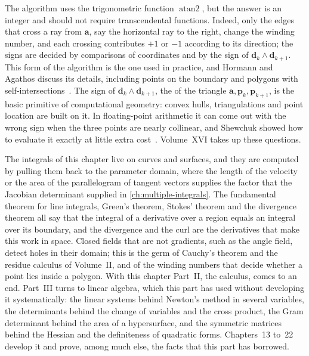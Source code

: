 The algorithm uses the trigonometric function $\operatorname{atan2}$, but the answer is an integer and should not require transcendental functions. Indeed, only the edges that cross a ray from $\mathbf a$, say the horizontal ray to the right, change the winding number, and each crossing contributes $+1$ or $-1$ according to its direction; the signs are decided by comparisons of coordinates and by the sign of $\mathbf d_k\wedge\mathbf d_{k+1}$. This  form of the algorithm is the one used in practice, and Hormann and Agathos discuss its details, including points on the boundary and polygons with self-intersections~\cite{hormann2001}. The sign of $\mathbf d_k\wedge\mathbf d_{k+1}$, the  of the triangle $\mathbf a,\mathbf p_k,\mathbf p_{k+1}$, is the basic primitive of computational geometry: convex hulls, triangulations and point location are built on it. In floating-point arithmetic it can come out with the wrong sign when the three points are nearly collinear, and Shewchuk showed how to evaluate it exactly at little extra cost~\cite{shewchuk1997}. Volume~XVI takes up these questions.

\bigskip
The integrals of this chapter live on curves and surfaces, and they are computed by pulling them back to the parameter domain, where the length of the velocity or the area of the parallelogram of tangent vectors supplies the factor that the Jacobian determinant supplied in \cref{ch:multiple-integrals}. The fundamental theorem for line integrals, Green's theorem, Stokes' theorem and the divergence theorem all say that the integral of a derivative over a region equals an integral over its boundary, and the divergence and the curl are the derivatives that make this work in space. Closed fields that are not gradients, such as the angle field, detect holes in their domain; this is the germ of Cauchy's theorem and the residue calculus of Volume~II, and of the winding numbers that decide whether a point lies inside a polygon. With this chapter Part~II, the calculus, comes to an end. Part~III turns to linear algebra, which this part has used without developing it systematically: the linear systems behind Newton's method in several variables, the determinants behind the change of variables and the cross product, the Gram determinant behind the area of a hypersurface, and the symmetric matrices behind the Hessian and the definiteness of quadratic forms. Chapters~13 to~22 develop it and prove, among much else, the facts that this part has borrowed.

\chapternotes

